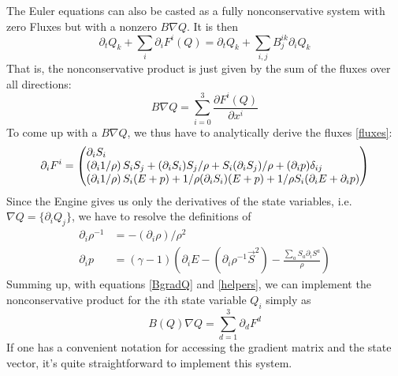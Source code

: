 \documentclass[a4paper]{article}
\newcommand{\pp}[2]{\frac{\partial #1}{\partial #2}}
\newenvironment{pvector}{\begin{pmatrix*}[l]}{\end{pmatrix*}}
\begin{document}
The Euler equations can also be casted as a fully nonconservative system with zero Fluxes but with a nonzero $B\nabla Q$. It is then
\begin{equation}
\partial_t Q_k + \sum_i \partial_i F^i(Q) =
\partial_t Q_k + \sum_{i,j} B^{ik}_j \partial_i Q_k
\end{equation}
That is, the nonconservative product is just given by the sum of 
the fluxes over all directions:
\begin{equation}
B \nabla Q = \sum_{i=0}^3 \pp{F^i(Q)}{x^i}
\end{equation}
To come up with a $B\nabla Q$, we thus have to analytically derive
the fluxes \eqref{fluxes}:
\begin{equation}\label{BgradQ}
\partial_i F^i =
\begin{pvector}
\partial_i S_i
\\
\left( \partial_i 1/\rho \right) S_i S_j
+ (\partial_i S_i) S_j / \rho
+ S_i (\partial_i S_j) / \rho
+ (\partial_i p) \delta_{ij}
\\
\left( \partial_i 1/\rho \right) S_i (E+p)
+ 1/\rho (\partial_i S_i) (E+p)
+ 1/\rho S_i (\partial_i E + \partial_i p)
\end{pvector}
\end{equation}
Since the Engine gives us only the derivatives of the state variables, i.e. $\nabla Q = \{ \partial_i Q_j \}$, we have to resolve the definitions of
\begin{align}\label{helpers}
\partial_i \rho^{-1} &= - (\partial_i \rho) / \rho^2
\\
\partial_i p &= (\gamma-1) \left( \partial_i E
 - \left( \partial_i \rho^{-1} \vec S^2 \right)
 - \frac{\sum_a S_a \partial_i S^a}{\rho} \right)
\end{align}
Summing up, with equations \eqref{BgradQ} and \eqref{helpers}, we
can implement the nonconservative product for the $i$th state
variable $Q_i$ simply as
\begin{equation}
B(Q) \nabla Q = \sum_{d=1}^3 \partial_d F^d
\end{equation}
If one has a convenient notation for accessing the gradient matrix and the state vector, it's quite straightforward to implement this system.
\end{document}
